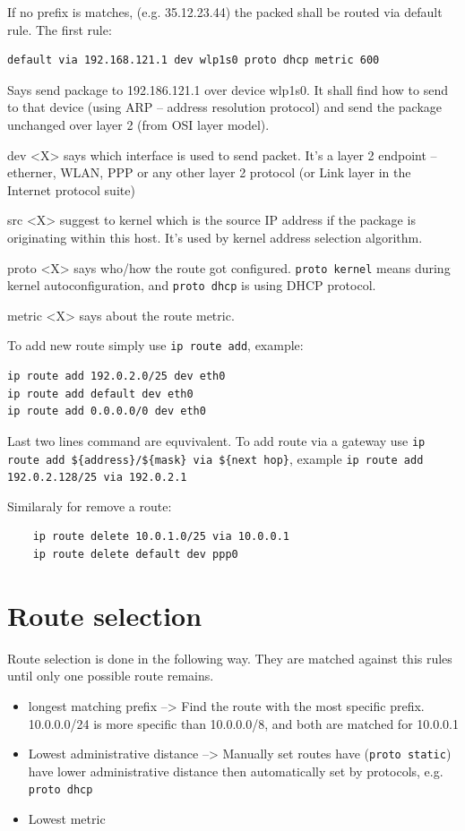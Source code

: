 \documentclass[times, utf8, seminar, english]{fer}
\begin{document}
If no prefix is matches, (e.g. 35.12.23.44) the packed shall be routed via default rule. The first rule:

\begin{verbatim}
default via 192.168.121.1 dev wlp1s0 proto dhcp metric 600
\end{verbatim}

Says send package to 192.186.121.1 over device wlp1s0. It shall find how to send to that device (using ARP -- address resolution protocol) and send the package unchanged over layer 2 (from OSI layer model).

dev <X> says which interface is used to send packet. It's a layer 2 endpoint -- etherner, WLAN, PPP or any other layer 2 protocol (or Link layer in the Internet protocol suite)

src <X> suggest to kernel which is the source IP address if the package is originating within this host. It's used by kernel address selection algorithm.

proto <X> says who/how the route got configured. \verb|proto kernel| means during kernel autoconfiguration, and \verb|proto dhcp| is using DHCP protocol.

metric <X> says about the route metric.

To add new route simply use \verb|ip route add|, example:
\begin{verbatim}
ip route add 192.0.2.0/25 dev eth0
ip route add default dev eth0
ip route add 0.0.0.0/0 dev eth0
\end{verbatim}

Last two lines command are equvivalent. To add route via a gateway use \verb|ip route add ${address}/${mask} via ${next hop}|, example
\verb|ip route add 192.0.2.128/25 via 192.0.2.1|

Similaraly for remove a route:
\begin{verbatim}
    ip route delete 10.0.1.0/25 via 10.0.0.1
    ip route delete default dev ppp0
\end{verbatim}

\section{Route selection}
\label{sec:route-sel}
Route selection is done in the following way. They are matched against this rules until only one possible route remains.
\begin{itemize}
    \item longest matching prefix --> Find the route with the most specific prefix. 10.0.0.0/24 is more specific than 10.0.0.0/8, and both are matched for 10.0.0.1
    \item Lowest administrative distance --> Manually set routes have (\verb|proto static|) have lower administrative distance then automatically set by protocols, e.g. \verb|proto dhcp|
    \item Lowest metric
\end{itemize}
\end{document}
